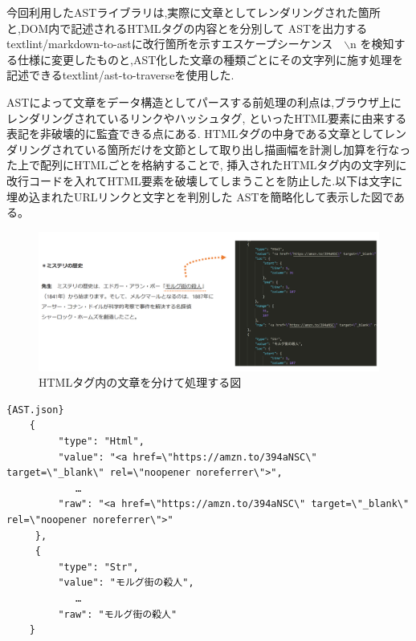 今回利用したASTライブラリは,実際に文章としてレンダリングされた箇所と,DOM内で記述されるHTMLタグの内容とを分別して
ASTを出力するtextlint/markdown-to-astに改行箇所を示すエスケープシーケンス　$\backslash$n
を検知する仕様に変更したものと\footnotemark[2],AST化した文章の種類ごとにその文字列に施す処理を記述できるtextlint/ast-to-traverseを使用した.\footnotemark[3]

ASTによって文章をデータ構造としてパースする前処理の利点は,ブラウザ上にレンダリングされているリンクやハッシュタグ,
といったHTML要素に由来する表記を非破壊的に監査できる点にある.
HTMLタグの中身である文章としてレンダリングされている箇所だけを文節として取り出し描画幅を計測し加算を行なった上で配列にHTMLごとを格納することで,
挿入されたHTMLタグ内の文字列に改行コードを入れてHTML要素を破壊してしまうことを防止した.以下は文字に埋め込まれたURLリンクと文字とを判別した
ASTを簡略化して表示した図である。

\begin{figure}[H]
    \centering
    \label{fig:image16}
    \includegraphics[width=0.7\columnwidth]{image/03/img7.png}
	\caption[HTMLタグ内の文章を分けて処理する図]{HTMLタグ内の文章を分けて処理する図} \footnotemark[4]
\end{figure}


\begin{lstlisting}{AST.json}
    {
         "type": "Html",
         "value": "<a href=\"https://amzn.to/394aNSC\" target=\"_blank\" rel=\"noopener noreferrer\">",
            …
         "raw": "<a href=\"https://amzn.to/394aNSC\" target=\"_blank\" rel=\"noopener noreferrer\">"
     },
     {
         "type": "Str",
         "value": "モルグ街の殺人",
            …
         "raw": "モルグ街の殺人"
    }
\end{lstlisting}

